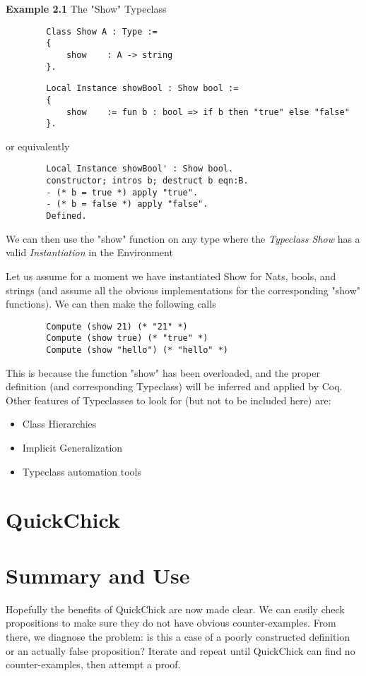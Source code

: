 \documentclass{article}
\begin{document}
    \textbf{Example 2.1} The "Show" Typeclass \\
    \begin{verbatim}
        Class Show A : Type :=
        {
            show    : A -> string
        }.
    \end{verbatim}
    \begin{verbatim}
        Local Instance showBool : Show bool :=
        {
            show    := fun b : bool => if b then "true" else "false"
        }.
    \end{verbatim}
    or equivalently
    \begin{verbatim}        
        Local Instance showBool' : Show bool.
        constructor; intros b; destruct b eqn:B.
        - (* b = true *) apply "true".
        - (* b = false *) apply "false".
        Defined.
    \end{verbatim}
    We can then use the "show" function on any type where the \emph{Typeclass Show} has a valid \emph{Instantiation} in the Environment

    Let us assume for a moment we have instantiated Show for Nats, bools, and strings (and assume all the obvious implementations for the corresponding "show" functions). 
    We can then make the following calls
    \begin{verbatim}
        Compute (show 21) (* "21" *)
        Compute (show true) (* "true" *)
        Compute (show "hello") (* "hello" *)
    \end{verbatim}
    This is because the function "show" has been overloaded, and the proper definition (and corresponding Typeclass)
    will be inferred and applied by Coq. \\
    Other features of Typeclasses to look for (but not to be included here) are:
    \begin{itemize}
        \item Class Hierarchies
        \item Implicit Generalization
        \item Typeclass automation tools
    \end{itemize}

    \section{QuickChick}
  
    \section{Summary and Use}
    Hopefully the benefits of QuickChick are now made clear. 
    We can easily check propositions to make sure they do not have obvious counter-examples.
    From there, we diagnose the problem: is this a case of a poorly constructed definition or an actually false proposition? 
    Iterate and repeat until QuickChick can find no counter-examples, then attempt a proof.
\end{document}
